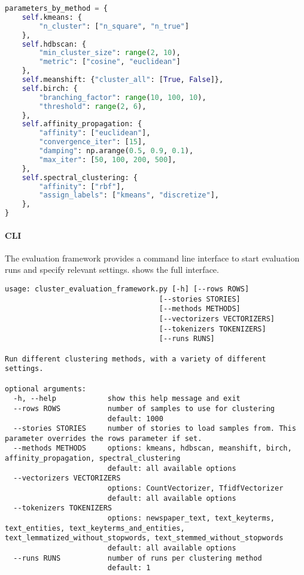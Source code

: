 \begin{lstlisting}[language=Python, caption=Predefined parameters for different clustering methods,label={lst:cluster_method_parameters}]
parameters_by_method = {
    self.kmeans: {
        "n_cluster": ["n_square", "n_true"]
    },
    self.hdbscan: {
        "min_cluster_size": range(2, 10),
        "metric": ["cosine", "euclidean"]
    },
    self.meanshift: {"cluster_all": [True, False]},
    self.birch: {
        "branching_factor": range(10, 100, 10),
        "threshold": range(2, 6),
    },
    self.affinity_propagation: {
        "affinity": ["euclidean"],
        "convergence_iter": [15],
        "damping": np.arange(0.5, 0.9, 0.1),
        "max_iter": [50, 100, 200, 500],
    },
    self.spectral_clustering: {
        "affinity": ["rbf"],
        "assign_labels": ["kmeans", "discretize"],
    },
}
\end{lstlisting}

\paragraph{CLI}
The evaluation framework provides a command line interface to start evaluation runs and specify relevant settings.
 shows the full interface.

\begin{lstlisting}[caption=Command line interface for the evaluation framework, label={lst:cluster_evaluation_framework}]
usage: cluster_evaluation_framework.py [-h] [--rows ROWS] 
                                    [--stories STORIES]
                                    [--methods METHODS]
                                    [--vectorizers VECTORIZERS]
                                    [--tokenizers TOKENIZERS] 
                                    [--runs RUNS]

Run different clustering methods, with a variety of different settings.

optional arguments:
  -h, --help            show this help message and exit
  --rows ROWS           number of samples to use for clustering 
                        default: 1000
  --stories STORIES     number of stories to load samples from. This parameter overrides the rows parameter if set.
  --methods METHODS     options: kmeans, hdbscan, meanshift, birch, affinity_propagation, spectral_clustering 
                        default: all available options
  --vectorizers VECTORIZERS
                        options: CountVectorizer, TfidfVectorizer 
                        default: all available options
  --tokenizers TOKENIZERS
                        options: newspaper_text, text_keyterms, text_entities, text_keyterms_and_entities, text_lemmatized_without_stopwords, text_stemmed_without_stopwords 
                        default: all available options
  --runs RUNS           number of runs per clustering method 
                        default: 1
\end{lstlisting}